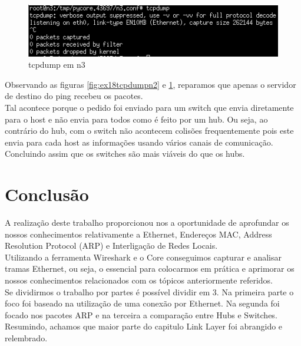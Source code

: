 \documentclass[a4paper]{report}
\begin{document}
\begin{figure}[H]
    \centering 
    \includegraphics[width=\textwidth]{images/ex18tcpdumpn3.png}
    \caption{tcpdump em n3}
    \label{fig:ex18tcpdumpn3}
\end{figure}
Observando as figuras \ref{fig:ex18tcpdumpn2} e \ref{fig:ex18tcpdumpn3},
reparamos que apenas o servidor de destino do ping recebeu os pacotes.\\
Tal acontece porque o pedido foi enviado para um switch que envia diretamente
para o host e não envia para todos como é feito por um hub. Ou seja, ao
contrário do hub, com o switch não acontecem colisões frequentemente pois este
envia para cada host as informações usando vários canais de comunicação.\\
Concluindo assim que os switches são mais viáveis do que os hubs.

\chapter{Conclusão}
A realização deste trabalho proporcionou nos a oportunidade de aprofundar os
nossos conhecimentos relativamente a Ethernet, Endereços MAC, Address Resolution
Protocol (ARP) e Interligação de Redes Locais.\\
Utilizando a ferramenta Wireshark e o Core conseguimos capturar e analisar
tramas Ethernet, ou seja, o essencial para colocarmos em prática e aprimorar os
nossos conhecimentos relacionados com os tópicos anteriormente referidos.\\
Se dividirmos o trabalho por partes é possível dividir em 3. Na primeira parte o
foco foi baseado na utilização de uma conexão por Ethernet. Na segunda foi
focado nos pacotes ARP e na terceira a comparação entre Hubs e Switches.
Resumindo, achamos que maior parte do capitulo Link Layer foi abrangido e
relembrado.
\end{document}
